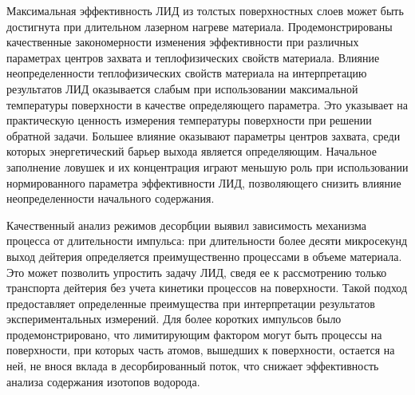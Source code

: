 Максимальная эффективность ЛИД из толстых поверхностных слоев может быть достигнута при длительном лазерном нагреве материала. Продемонстрированы качественные закономерности изменения эффективности при различных параметрах центров захвата и теплофизических свойств материала. Влияние неопределенности теплофизических свойств материала на интерпретацию результатов ЛИД оказывается слабым при использовании максимальной температуры поверхности в качестве определяющего параметра. Это указывает на практическую ценность измерения температуры поверхности при решении обратной задачи. Большее влияние оказывают параметры центров захвата, среди которых энергетический барьер выхода является определяющим. Начальное заполнение ловушек и их концентрация играют меньшую роль при использовании нормированного параметра эффективности ЛИД, позволяющего снизить влияние неопределенности начального содержания.

Качественный анализ режимов десорбции выявил зависимость механизма процесса от длительности импульса: при длительности более десяти микросекунд выход дейтерия определяется преимущественно процессами в объеме материала. Это может позволить упростить задачу ЛИД, сведя ее к рассмотрению только транспорта дейтерия без учета кинетики процессов на поверхности. Такой подход предоставляет определенные преимущества при интерпретации результатов экспериментальных измерений. Для более коротких импульсов было продемонстрировано, что лимитирующим фактором могут быть процессы на поверхности, при которых часть атомов, вышедших к поверхности, остается на ней, не внося вклада в десорбированный поток, что снижает эффективность анализа содержания изотопов водорода.


\clearpage
